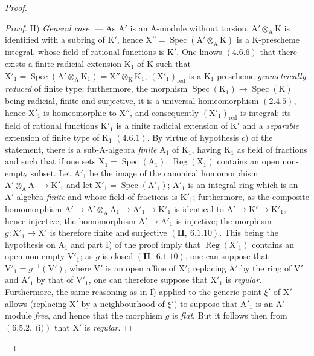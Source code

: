 \begin{proof}
\begin{proof}
II) \emph{General case.} --- As $\mathrm{A}'$ is an $\mathrm{A}$-module without torsion, $\mathrm{A}'\otimes_\mathrm{A}\mathrm{K}$ is identified with a
subring of $\mathrm{K}'$, hence $\mathrm{X}''=\operatorname{Spec}(\mathrm{A}'\otimes_\mathrm{A}\mathrm{K})$ is a $\mathrm{K}$-prescheme integral, whose field of
rational functions is $\mathrm{K}'$. One knows $(4.6.6)$ that there exists a finite radicial extension
$\mathrm{K}_1$ of $\mathrm{K}$ such that $\mathrm{X}'_1=\operatorname{Spec}(\mathrm{A}'\otimes_\mathrm{A}\mathrm{K}_1)=\mathrm{X}''\otimes_\mathrm{K}\mathrm{K}_1$, $(\mathrm{X}'_1)_{\mathrm{red}}$ is a $\mathrm{K}_1$-prescheme \emph{geometrically
reduced} of finite type; furthermore, the morphism $\operatorname{Spec}(\mathrm{K}_1)\to\operatorname{Spec}(\mathrm{K})$ being radicial,
finite and surjective, it is a universal homeomorphism $(2.4.5)$, hence $\mathrm{X}'_1$ is homeomorphic
to $\mathrm{X}''$, and consequently $(\mathrm{X}'_1)_{\mathrm{red}}$ is integral; its field of rational functions $\mathrm{K}'_1$
is a finite radicial extension of $\mathrm{K}'$ and a \emph{separable} extension of finite type of $\mathrm{K}_1$ $(4.6.1)$.
By virtue of hypothesis $c)$ of the statement, there is a sub-$\mathrm{A}$-algebra \emph{finite} $\mathrm{A}_1$ of $\mathrm{K}_1$, having $\mathrm{K}_1$
as field of fractions and such that if one sets $\mathrm{X}_1=\operatorname{Spec}(\mathrm{A}_1)$, $\operatorname{Reg}(\mathrm{X}_1)$ contains an
open non-empty subset. Let $\mathrm{A}'_1$ be the image of the canonical homomorphism $\mathrm{A}'\otimes_\mathrm{A}\mathrm{A}_1\to\mathrm{K}'_1$
and let $\mathrm{X}'_1=\operatorname{Spec}(\mathrm{A}'_1)$; $\mathrm{A}'_1$ is an integral ring which is an $\mathrm{A}'$-algebra \emph{finite} and whose
field of fractions is $\mathrm{K}'_1$; furthermore, as the composite homomorphism
$\mathrm{A}'\to\mathrm{A}'\otimes_\mathrm{A}\mathrm{A}_1\to\mathrm{A}'_1\to\mathrm{K}'_1$ is identical to $\mathrm{A}'\to\mathrm{K}'\to\mathrm{K}'_1$, hence injective, the homomorphism
$\mathrm{A}'\to\mathrm{A}'_1$ is injective; the morphism $g:\mathrm{X}'_1\to\mathrm{X}'$ is therefore finite and surjective $(\mathbf{II},~6.1.10)$.
This being the hypothesis on $\mathrm{A}_1$ and part I) of the proof imply that $\operatorname{Reg}(\mathrm{X}'_1)$
contains an open non-empty $\mathrm{V}'_1$; as $g$ is closed $(\mathbf{II},~6.1.10)$, one can suppose
that $\mathrm{V}'_1=g^{-1}(\mathrm{V}')$, where $\mathrm{V}'$ is an open affine of $\mathrm{X}'$; replacing $\mathrm{A}'$ by the ring of $\mathrm{V}'$
and $\mathrm{A}'_1$ by that of $\mathrm{V}'_1$, one can therefore suppose that $\mathrm{X}'_1$ is \emph{regular}. Furthermore, the same
reasoning as in I) applied to the generic point $\xi'$ of $\mathrm{X}'$ allows (replacing $\mathrm{X}'$
by a neighbourhood of $\xi'$) to suppose that $\mathrm{A}'_1$ is an $\mathrm{A}'$-module \emph{free}, and hence
that the morphism $g$ is \emph{flat}. But it follows then from $(6.5.2,~\text{(i)})$ that $\mathrm{X}'$ is \emph{regular}.
\end{proof}


\end{proof}
